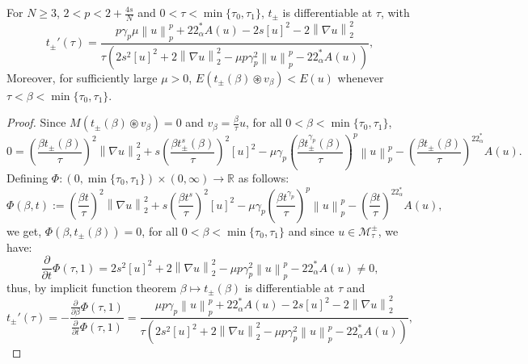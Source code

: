 \documentclass[10pt,a4paper]{amsart}
\begin{document}
		\begin{lemma}\label{Lemma 4.2}
			For $N\geq 3$, $2<p<2+\frac{4s}{N}$ and $0<\tau<\min\{\tau_0,\tau_1\}$, $t_{\pm}$ is differentiable at $\tau$, with
			\begin{equation*}
				t_{\pm}'(\tau) =\frac{p\gamma_p\mu\left\| u \right\|_p^p+22^*_{\alpha}A(u)-2s[u]^2-2\left\| \nabla u \right\|_2^2}{\tau\left(2s^2[u]^2+2\left\| \nabla u \right\|_2^2-\mu p\gamma_p^2\left\| u \right\|_p^p-22^*_{\alpha}A(u)\right)},
			\end{equation*}
			Moreover, for sufficiently large $\mu>0$, $E(t_{\pm}(\beta)\circledast v_{\beta})<E(u)$ whenever $\tau<\beta<\min\{\tau_0,\tau_1\}$.
		\end{lemma}

		\begin{proof}
			Since $M(t_{\pm}(\beta)\circledast v_{\beta})=0$ and $v_{\beta}=\frac{\beta}{\tau}u$, for all $0<\beta<\min\{\tau_0,\tau_1\}$,
			\begin{equation*}
				0 = 
				\left(\frac{\beta t_{\pm}(\beta)}{\tau}\right)^2\left\| \nabla u \right\|_2^2+s\left(\frac{\beta t_{\pm}^s(\beta)}{\tau}\right)^2[u]^2-\mu\gamma_p\left(\frac{\beta t_{\pm}^{\gamma_p}(\beta)}{\tau}\right)^p\left\| u \right\|_p^p-\left(\frac{\beta t_{\pm}(\beta)}{\tau}\right)^{22^*_{\alpha}}A(u).
			\end{equation*}
			Defining $\Phi: (0,\min\{\tau_0,\tau_1\})\times (0,\infty)\rightarrow \mathbb{R}$ as follows:
			$$\Phi(\beta, t):=				\left(\frac{\beta t}{\tau}\right)^2\left\| \nabla u \right\|_2^2+s\left(\frac{\beta t^s}{\tau}\right)^2[u]^2-\mu\gamma_p\left(\frac{\beta t^{\gamma_p}}{\tau}\right)^p\left\| u \right\|_p^p-\left(\frac{\beta t}{\tau}\right)^{22^*_{\alpha}}A(u),$$
			we get, $\Phi(\beta,t_{\pm}(\beta))=0$, for all $0<\beta<\min\{\tau_0,\tau_1\}$ and since $u\in \mathcal{M}_{\tau}^{\pm}$, we have:
			$$\frac{\partial}{\partial t}\Phi(\tau,1)= 2s^2[u]^2+2\left\| \nabla u \right\|_2^2-\mu p\gamma_p^2\left\| u \right\|_p^p-22^*_{\alpha}A(u)\neq 0,$$
			thus, by implicit function theorem $\beta\mapsto t_{\pm}(\beta)$ is differentiable at $\tau$ and 
			\begin{equation*}
				t_{\pm}'(\tau)=-\frac{\frac{\partial }{\partial \beta}\Phi(\tau,1)}{\frac{\partial}{\partial t}\Phi(\tau,1)}=\frac{\mu p\gamma_p\left\| u \right\|_p^p+22^*_{\alpha}A(u)-2s[u]^2-2\left\| \nabla u \right\|_2^2}{\tau\left(2s^2[u]^2+2\left\| \nabla u \right\|_2^2-\mu p\gamma_p^2\left\| u \right\|_p^p-22^*_{\alpha}A(u)\right)},
			\end{equation*}

\end{proof}
\end{document}
